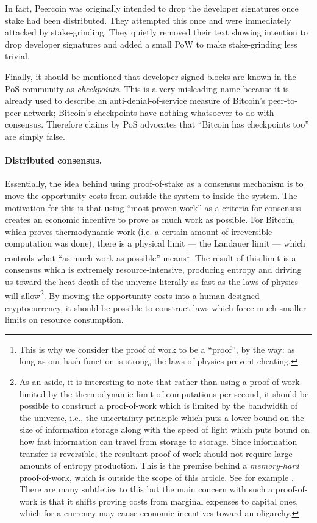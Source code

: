 \documentclass[letterpaper]{article}
\begin{document}
In fact, Peercoin was originally intended to drop the developer signatures once stake
had been distributed. They attempted this once and were immediately attacked by stake-grinding.
They quietly removed their text showing intention to drop developer signatures and added
a small PoW to make stake-grinding less trivial.

Finally, it should be mentioned that developer-signed blocks are known in the PoS
community as \emph{checkpoints}. This is a very misleading name because it is already
used to describe an anti-denial-of-service measure of Bitcoin's peer-to-peer network;
Bitcoin's checkpoints have nothing whatsoever to do with consensus. Therefore claims
by PoS advocates that ``Bitcoin has checkpoints too'' are simply false.

\paragraph{Distributed consensus.}
Essentially, the idea behind using proof-of-stake as a consensus mechanism is to
move the opportunity costs from outside the system to inside the system. The
motivation for this is that using ``most proven work'' as a criteria for consensus
creates an economic incentive to prove as much work as possible. For Bitcoin, which
proves thermodynamic work (i.e. a certain amount of irreversible computation was
done), there is a physical limit --- the Landauer limit --- which controls what
``as much work as possible'' means\footnote{This is why we consider the proof of work to
be a ``proof'', by the way: as long as our hash function is strong, the laws of
physics prevent cheating.}. The result
of this limit is a consensus which is
extremely resource-intensive, producing entropy and driving us toward the heat death
of the universe literally as fast as the laws of physics will allow\footnote{As an
aside, it is interesting
to note that rather than using a proof-of-work limited
by the thermodynamic limit of computations per second, it should be possible to
construct a proof-of-work which is limited by the bandwidth of the universe, i.e.,
the uncertainty principle which puts a lower bound on the size of information storage
along with the speed of light which puts bound on how fast information can travel from
storage to storage. Since information transfer is reversible, the resultant proof of
work should not require large amounts of entropy production. This is the premise behind a
\emph{memory-hard} proof-of-work, which is outside the scope of this article. See
for example \cite{tromp2014}. There are many subtleties to this but the main
concern with such a proof-of-work is that it shifts proving costs from marginal
expenses to capital ones, which for a currency may cause economic incentives toward
an oligarchy.}.
By moving the opportunity costs into a human-designed cryptocurrency, it should be
possible to construct laws which force much smaller limits on resource consumption.
\end{document}
